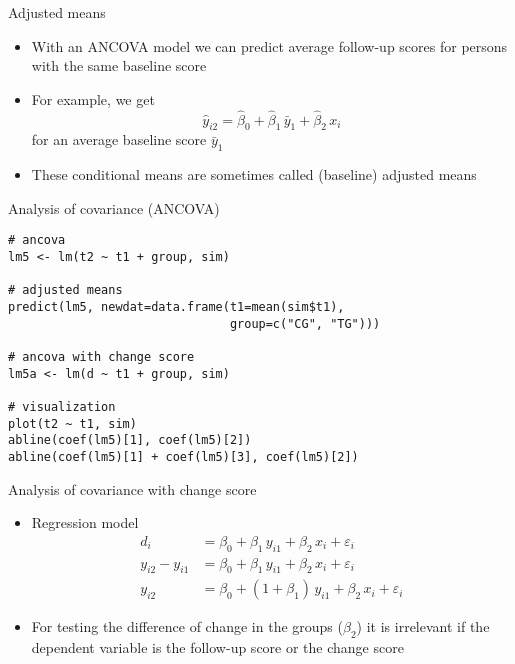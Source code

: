 \documentclass{beamer}
\begin{document}
\begin{frame}{Adjusted means}
\begin{itemize}
  \item With an ANCOVA model we can predict average follow-up scores for
    persons with the same baseline score
  \item For example, we get
    \[
      \hat{y}_{i2} = \hat{\beta}_0 + \hat{\beta}_1 \, \bar{y}_1 +
                     \hat{\beta}_2 \, x_i
    \]
    for an average baseline score $\bar{y}_1$
\item These conditional means are sometimes called (baseline) adjusted
  means
\end{itemize}
\end{frame}

{

\begin{frame}[fragile]{Analysis of covariance (ANCOVA)}
\begin{lstlisting}
# ancova
lm5 <- lm(t2 ~ t1 + group, sim)

# adjusted means
predict(lm5, newdat=data.frame(t1=mean(sim$t1), 
                               group=c("CG", "TG")))

# ancova with change score
lm5a <- lm(d ~ t1 + group, sim)

# visualization
plot(t2 ~ t1, sim)
abline(coef(lm5)[1], coef(lm5)[2])
abline(coef(lm5)[1] + coef(lm5)[3], coef(lm5)[2])
\end{lstlisting}
\end{frame}

}

\begin{frame}{Analysis of covariance with change score}
\begin{itemize}
  \item Regression model
    \begin{align*}
                  d_i &= \beta_0 + \beta_1 \, y_{i1} + \beta_2 \, x_i + \varepsilon_i \\
      y_{i2} - y_{i1} &= \beta_0 + \beta_1 \, y_{i1} + \beta_2 \, x_i + \varepsilon_i \\
               y_{i2} &= \beta_0 + (1 + \beta_1) \, y_{i1} + \beta_2 \, x_i + \varepsilon_i
    \end{align*}
  \item For testing the difference of change in the groups ($\beta_2$) it
    is irrelevant if the dependent variable is the follow-up score or the
    change score
  \vfill
\end{itemize}
\end{frame}
\end{document}
